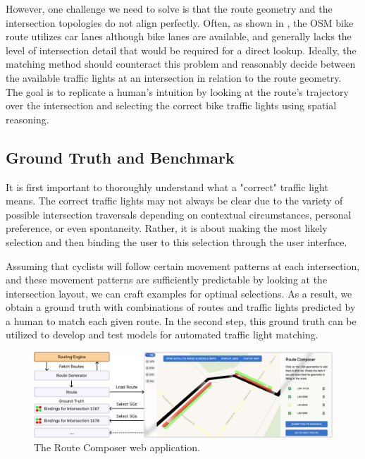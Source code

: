 However, one challenge we need to solve is that the route geometry and the intersection topologies do not align perfectly. Often, as shown in , the OSM bike route utilizes car lanes although bike lanes are available, and generally lacks the level of intersection detail that would be required for a direct lookup. Ideally, the matching method should counteract this problem and reasonably decide between the available traffic lights at an intersection in relation to the route geometry. The goal is to replicate a human's intuition by looking at the route's trajectory over the intersection and selecting the correct bike traffic lights using spatial reasoning.

\subsection{Ground Truth and Benchmark}

It is first important to thoroughly understand what a "correct" traffic light means. The correct traffic lights may not always be clear due to the variety of possible intersection traversals depending on contextual circumstances, personal preference, or even spontaneity. Rather, it is about making the most likely selection and then binding the user to this selection through the user interface.

Assuming that cyclists will follow certain movement patterns at each intersection, and these movement patterns are sufficiently predictable by looking at the intersection layout, we can craft examples for optimal selections. As a result, we obtain a ground truth with combinations of routes and traffic lights predicted by a human to match each given route. In the second step, this ground truth can be utilized to develop and test models for automated traffic light matching.

\begin{figure}[htbp]
\centering
\includegraphics[width=\linewidth]{images/sg-selection-ground-truth.pdf}
\caption{The Route Composer web application.}
\label{fig:sg-selection-ground-truth}
\end{figure}

